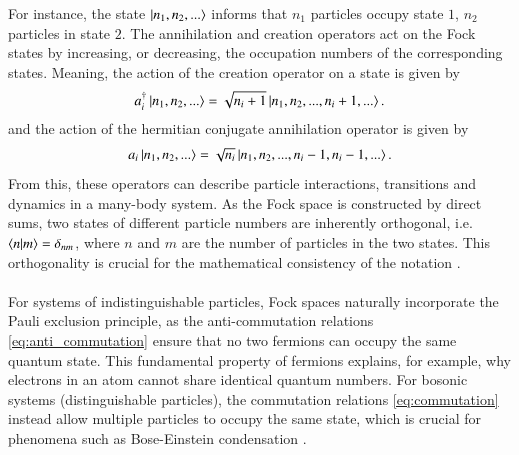 \documentclass{subfiles}
\begin{document}
For instance, the state $\ket{n_1, n_2, ...}$ informs that $n_1$ particles occupy state $1$, $n_2$ particles  in state $2$. The annihilation and creation operators act on the Fock states by increasing, or decreasing, the occupation numbers of the corresponding states. Meaning, the action of the creation operator on a state is given by
\begin{align*}
    a^\dagger_i\ket{n_1, n_2, ...} = \sqrt{n_i + 1}\ket{n_1, n_2, ..., n_i + 1, ...}.
\end{align*}
and the action of the hermitian conjugate annihilation operator is given by
\begin{align*}
    a_i\ket{n_1, n_2, ...} = \sqrt{n_i}\ket{n_1, n_2, ...,n_i-1, n_i - 1, ...}.
\end{align*}
From this, these operators can describe particle interactions, transitions and dynamics in a many-body system. As the Fock space is constructed by direct sums, two states of different particle numbers are inherently orthogonal, i.e. $\braket{n|m} = \delta_{nm}$, where $n$ and $m$ are the number of particles in the two states. This orthogonality is crucial for the mathematical consistency of the notation \cite{helgaker2013molecular, shavitt2009many}.
\\\\ 
For systems of indistinguishable particles, Fock spaces naturally incorporate the Pauli exclusion principle, as the anti-commutation relations \ref{eq:anti_commutation} ensure that no two fermions can occupy the same quantum state. This fundamental property of fermions explains, for example, why electrons in an atom cannot share identical quantum numbers. For bosonic systems (distinguishable particles), the commutation relations \ref{eq:commutation} instead allow multiple particles to occupy the same state, which is crucial for phenomena such as Bose-Einstein condensation \cite{pethick2008bose}.
\end{document}

